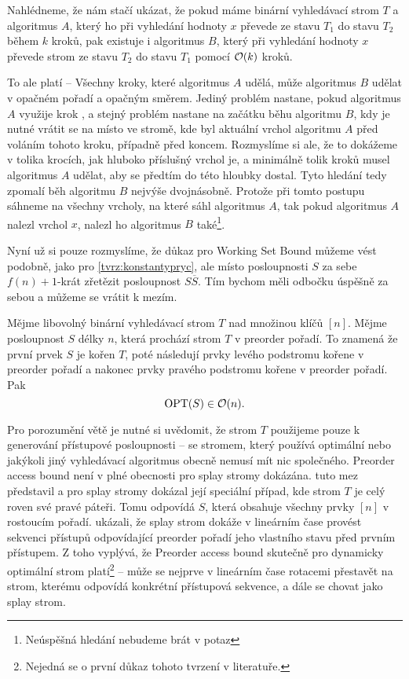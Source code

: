 \begin{dukaz}
Nahlédneme, že nám stačí ukázat, že pokud máme binární vyhledávací strom $T$ a
algoritmus $A$, který ho při vyhledání hodnoty $x$ převede ze stavu $T_1$ do stavu
$T_2$ během $k$ kroků, pak existuje i algoritmus $B$, který při vyhledání hodnoty
$x$ převede strom ze stavu $T_2$ do stavu $T_1$ pomocí $\mathcal O(k)$ kroků.

To ale platí -- Všechny kroky, které algoritmus $A$ udělá, může algoritmus $B$ udělat v opačném pořadí a opačným směrem. Jediný problém nastane, pokud algoritmus $A$ využije krok , a stejný problém nastane na začátku běhu algoritmu $B$, kdy je nutné vrátit se na místo ve stromě, kde byl aktuální vrchol algoritmu $A$ před voláním tohoto kroku, případně před koncem. Rozmyslíme si ale, že to dokážeme v tolika krocích, jak hluboko příslušný vrchol je, a minimálně tolik kroků musel algoritmus $A$ udělat, aby se předtím do této hloubky dostal. Tyto hledání tedy zpomalí běh algoritmu $B$ nejvýše dvojnásobně. Protože při tomto postupu sáhneme na všechny vrcholy, na které sáhl algoritmus $A$, tak pokud algoritmus $A$ nalezl vrchol $x$, nalezl ho algoritmus $B$ také\footnote{Neúspěšná hledání nebudeme brát v potaz}.
\end{dukaz}

Nyní už si pouze rozmyslíme, že důkaz pro Working Set Bound můžeme vést podobně, jako pro \ref{tvrz:konstantypryc}, ale místo posloupnosti $S$ za sebe $f(n)+1$-krát zřetězit posloupnost $S\overline S$. Tím bychom měli odbočku úspěšně za sebou a můžeme se vrátit k mezím. 

\begin{veta}
Mějme libovolný binární vyhledávací strom $T$ nad množinou klíčů $[n]$. Mějme posloupnost $S$ délky $n$, která prochází strom $T$ v preorder pořadí. To znamená že první prvek $S$ je kořen $T$, poté následují prvky levého podstromu kořene v preorder pořadí a nakonec prvky pravého podstromu kořene v preorder pořadí. Pak $$\operatorname{OPT}(S)\in \mathcal O(n).$$
\end{veta}

Pro porozumění větě je nutné si uvědomit, že strom $T$ použijeme pouze k generování přístupové posloupnosti -- se stromem, který používá optimální nebo jakýkoli jiný vyhledávací algoritmus obecně nemusí mít nic společného. Preorder access bound není v plné obecnosti pro splay stromy dokázána. \citet{preordertarjan} tuto mez představil a pro splay stromy dokázal její speciální případ, kde strom $T$ je celý roven své pravé páteři. Tomu odpovídá $S$, která obsahuje všechny prvky $[n]$ v rostoucím pořadí. \citet{preordersplay} ukázali, že splay strom dokáže v lineárním čase provést sekvenci přístupů odpovídající preorder pořadí jeho vlastního stavu před prvním přístupem. Z toho vyplývá, že Preorder access bound skutečně pro dynamicky optimální strom platí\footnote{Nejedná se o první důkaz tohoto tvrzení v literatuře.} -- může se nejprve v lineárním čase rotacemi přestavět na strom, kterému odpovídá konkrétní přístupová sekvence, a dále se chovat jako splay strom. 

